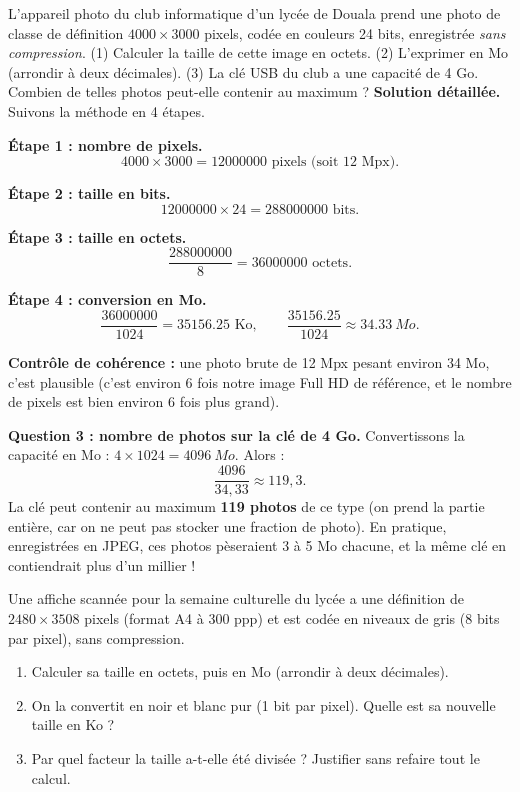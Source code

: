 \documentclass[11pt]{article}
\begin{document}
\begin{exoresolu}
L'appareil photo du club informatique d'un lycée de Douala prend une photo de classe de définition $4000 \times 3000$ pixels, codée en couleurs 24 bits, enregistrée \emph{sans compression}. (1) Calculer la taille de cette image en octets. (2) L'exprimer en Mo (arrondir à deux décimales). (3) La clé USB du club a une capacité de 4 Go. Combien de telles photos peut-elle contenir au maximum ?
\tcblower
\textbf{Solution détaillée.} Suivons la méthode en 4 étapes.

\textbf{Étape 1 : nombre de pixels.}
\[ 4000 \times 3000 = \num{12000000} \text{ pixels (soit 12 Mpx)}. \]

\textbf{Étape 2 : taille en bits.}
\[ \num{12000000} \times 24 = \num{288000000} \text{ bits}. \]

\textbf{Étape 3 : taille en octets.}
\[ \frac{\num{288000000}}{8} = \num{36000000} \text{ octets}. \]

\textbf{Étape 4 : conversion en Mo.}
\[ \frac{\num{36000000}}{1024} = \num{35156,25} \text{ Ko}, \qquad \frac{\num{35156,25}}{1024} \approx \SI{34.33}{Mo}. \]

\textbf{Contrôle de cohérence :} une photo brute de 12 Mpx pesant environ 34 Mo, c'est plausible (c'est environ 6 fois notre image Full HD de référence, et le nombre de pixels est bien environ 6 fois plus grand).

\textbf{Question 3 : nombre de photos sur la clé de 4 Go.}
Convertissons la capacité en Mo : $4 \times 1024 = \SI{4096}{Mo}$. Alors :
\[ \frac{4096}{34,33} \approx 119,3. \]
La clé peut contenir au maximum \textbf{119 photos} de ce type (on prend la partie entière, car on ne peut pas stocker une fraction de photo). En pratique, enregistrées en JPEG, ces photos pèseraient 3 à 5 Mo chacune, et la même clé en contiendrait plus d'un millier !
\end{exoresolu}

\begin{exercice}
Une affiche scannée pour la semaine culturelle du lycée a une définition de $2480 \times 3508$ pixels (format A4 à 300 ppp) et est codée en niveaux de gris (8 bits par pixel), sans compression.
\begin{enumerate}
\item Calculer sa taille en octets, puis en Mo (arrondir à deux décimales).
\item On la convertit en noir et blanc pur (1 bit par pixel). Quelle est sa nouvelle taille en Ko ?
\item Par quel facteur la taille a-t-elle été divisée ? Justifier sans refaire tout le calcul.
\end{enumerate}
\end{exercice}
\end{document}
